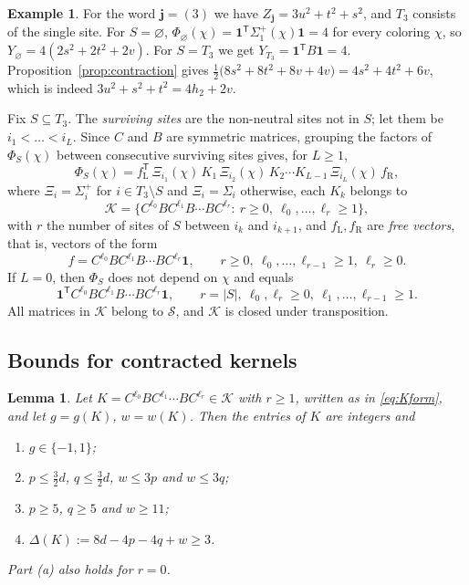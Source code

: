 \documentclass{amsart}
\newtheorem{lemma}[theorem]{Lemma}
\theoremstyle{definition}
\newtheorem{example}[theorem]{Example}
\theoremstyle{remark}
\numberwithin{equation}{section}
\newcommand{\one}{\mathbf{1}}
\newcommand{\jj}{\mathbf{j}}
\newcommand{\cK}{\mathcal{K}}
\newcommand{\cS}{\mathcal{S}}
\begin{document}
\begin{example}
For the word $\jj=(3)$ we have $Z_\jj=3u^2+t^2+s^2$, and $T_3$ consists of the single site. For $S=\varnothing$, $\Phi_\varnothing(\chi)=\one^{\mathsf T}\Sigma_1^+(\chi)\one=4$ for every coloring $\chi$, so $Y_\varnothing=4(2s^2+2t^2+2v)$. For $S=T_3$ we get $Y_{T_3}=\one^{\mathsf T}B\one=4$. Proposition~\ref{prop:contraction} gives $\frac12\bigl(8s^2+8t^2+8v+4v\bigr)=4s^2+4t^2+6v$, which is indeed $3u^2+s^2+t^2=4h_2+2v$.
\end{example}

Fix $S\subseteq T_3$. The \emph{surviving sites} are the non-neutral sites not in $S$; let them be $i_1<\dots<i_L$. Since $C$ and $B$ are symmetric matrices, grouping the factors of $\Phi_S(\chi)$ between consecutive surviving sites gives, for $L\ge1$,
\begin{equation}\label{eq:NS}
\Phi_S(\chi)=f_{\mathrm L}^{\mathsf T}\,\Xi_{i_1}(\chi)\,K_1\,\Xi_{i_2}(\chi)\,K_2\cdots K_{L-1}\,\Xi_{i_L}(\chi)\,f_{\mathrm R},
\end{equation}
where $\Xi_i=\Sigma_i^+$ for $i\in T_3\setminus S$ and $\Xi_i=\Sigma_i$ otherwise, each $K_k$ belongs to
\[
\cK=\bigl\{C^{\ell_0}BC^{\ell_1}B\cdots BC^{\ell_r}:\ r\ge0,\ \ell_0,\dots,\ell_r\ge1\bigr\},
\]
with $r$ the number of sites of $S$ between $i_k$ and $i_{k+1}$, and $f_{\mathrm L},f_{\mathrm R}$ are \emph{free vectors}, that is, vectors of the form
\begin{equation}\label{eq:free}
f=C^{\ell_0}BC^{\ell_1}B\cdots BC^{\ell_r}\one,\qquad r\ge0,\ \ell_0,\dots,\ell_{r-1}\ge1,\ \ell_r\ge0 .
\end{equation}
If $L=0$, then $\Phi_S$ does not depend on $\chi$ and equals
\begin{equation}\label{eq:scalar}
\one^{\mathsf T}C^{\ell_0}BC^{\ell_1}B\cdots BC^{\ell_r}\one,\qquad r=|S|,\ \ell_0,\ell_r\ge0,\ \ell_1,\dots,\ell_{r-1}\ge1 .
\end{equation}
All matrices in $\cK$ belong to $\cS$, and $\cK$ is closed under transposition.

\subsection{Bounds for contracted kernels}

\begin{lemma}\label{lem:kernels}
Let $K=C^{\ell_0}BC^{\ell_1}\cdots BC^{\ell_r}\in\cK$ with $r\ge1$, written as in \eqref{eq:Kform}, and let $g=g(K)$, $w=w(K)$. Then the entries of $K$ are integers and
\begin{enumerate}
\item[(a)] $g\in\{-1,1\}$;
\item[(b)] $p\le\frac32d$, $q\le\frac32d$, $w\le3p$ and $w\le3q$;
\item[(c)] $p\ge5$, $q\ge5$ and $w\ge11$;
\item[(d)] $\Delta(K):=8d-4p-4q+w\ge3$.
\end{enumerate}
Part (a) also holds for $r=0$.
\end{lemma}
\end{document}
